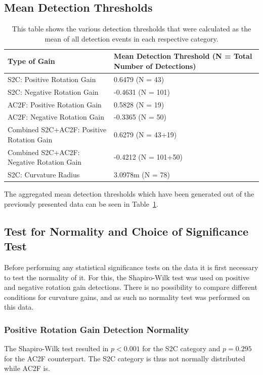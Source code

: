 \subsection{Mean Detection Thresholds}
\begin{table}[!h]
\centering
\begin{tabularx}{\textwidth}{|X|X|}
\hline
Type of Gain & Mean Detection Threshold (N = Total Number of Detections) \\
\hline
S2C: Positive Rotation Gain & 0.6479 (N = 43) \\
\hline
S2C: Negative Rotation Gain & -0.4631 (N = 101) \\
\hline
AC2F: Positive Rotation Gain & 0.5828 (N = 19) \\
\hline
AC2F: Negative Rotation Gain & -0.3365 (N = 50) \\
\hline
Combined S2C+AC2F: Positive Rotation Gain & 0.6279 (N = 43+19) \\
\hline
Combined S2C+AC2F: Negative Rotation Gain & -0.4212 (N = 101+50) \\
\hline
S2C: Curvature Radius & 3.0978m (N = 78) \\
\hline
\end{tabularx}
\caption[Experiment 1: Mean Detection Thresholds]{This table shows the various detection thresholds that were calculated as the mean of all detection events in each respective category.}
\label{table:ex1DetectionThresholds}
\end{table}

The aggregated mean detection thresholds which have been generated out of the previously presented data can be seen in Table~\ref{table:ex1DetectionThresholds}. 

\subsection{Test for Normality and Choice of Significance Test}
Before performing any statistical significance tests on the data it is first necessary to test the normality of it. For this, the Shapiro-Wilk test was used on positive and negative rotation gain detections. There is no possibility to compare different conditions for curvature gains, and as such no normality test was performed on this data. 

\subsubsection{Positive Rotation Gain Detection Normality}
The Shapiro-Wilk test resulted in $p < 0.001$ for the S2C category and $p = 0.295$ for the AC2F counterpart. The S2C category is thus not normally distributed while AC2F is. 

